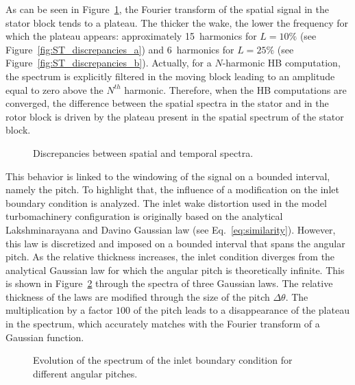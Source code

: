 As can be seen in Figure~\ref{fig:ST_discrepancies}, 
the Fourier transform of the spatial signal in the stator block tends to a plateau. 
The thicker the wake, 
the lower the frequency for which the plateau appears: 
approximately 15~harmonics for $L=10\%$
(see Figure~\ref{fig:ST_discrepancies_a}) and 
6~harmonics for $L=25\%$ (see Figure~\ref{fig:ST_discrepancies_b}).
Actually, for a $N$-harmonic HB computation, the spectrum is 
explicitly filtered in the moving block leading to an amplitude 
equal to zero above the $N^{th}$ harmonic. 
Therefore, when the HB computations are converged, the difference between the spatial 
spectra in the stator and in the rotor block is driven by the plateau present 
in the spatial spectrum of the stator block.
\begin{figure}[htp]
  \begin{center}
  \end{center}
  \caption{Discrepancies between spatial and temporal spectra.}
  \label{fig:ST_discrepancies}
\end{figure}

This behavior is linked to the windowing of the signal on 
a bounded interval, namely the pitch. To highlight that, the influence of 
a modification on the inlet boundary condition is analyzed.
The inlet wake distortion used in the model turbomachinery configuration is 
originally based on the analytical Lakshminarayana and Davino 
Gaussian law (see Eq.~\eqref{eq:similarity}). However, 
this law is discretized and imposed on a bounded interval 
that spans the angular pitch. As the relative thickness 
increases, the inlet condition diverges from the analytical 
Gaussian law for which the angular pitch is theoretically 
infinite. This is shown in Figure~\ref{fig:inlet_law_fft} 
through the spectra of three Gaussian laws. The relative 
thickness of the laws are modified through the size 
of the pitch $\Delta \theta$. The multiplication by a factor $100$ 
of the pitch leads to a disappearance of the plateau 
in the spectrum, which accurately matches with the 
Fourier transform of a Gaussian function. 
\begin{figure}[htp]
  \centering
  \caption{Evolution of the spectrum of the inlet boundary condition for different angular pitches.}
  \label{fig:inlet_law_fft}
\end{figure}

